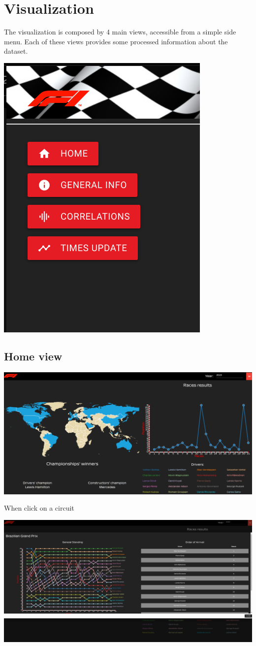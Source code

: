 \documentclass[10pt,twocolumn,letterpaper]{article}
\begin{document}
\section{Visualization}
The visualization is composed by 4 main views, accessible from a simple side menu. Each of these views provides some processed information about the dataset.
\begin{center}
	\centering
	\includegraphics[width=0.3\columnwidth]{menu}
\end{center}

\subsection{Home view}
\begin{center}
	\centering
	\includegraphics[width=\columnwidth]{home}
\end{center}

When click on a circuit
\begin{center}
	\centering
	\includegraphics[width=\columnwidth]{map-clicked}
\end{center}
\end{document}
